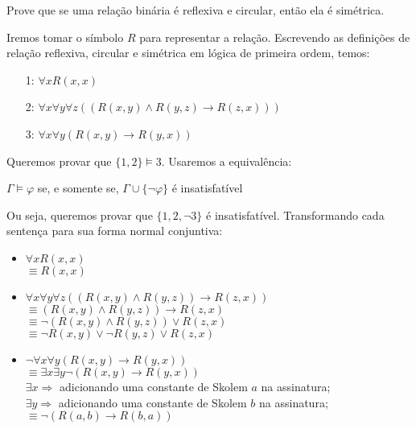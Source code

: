 \begin{rexercises}
    \begin{question}
        Prove que se uma relação binária é reflexiva e circular, então ela é simétrica.
        \begin{resolution}
            Iremos tomar o símbolo $R$ para representar a relação. Escrevendo as definições de relação reflexiva, circular e simétrica em lógica de primeira ordem, temos:
            \begin{enumerate}
                \item[1:] $\forall x R(x,x)$
                \item[2:] $\forall x\forall y\forall z((R(x, y) \land R(y, z) \rightarrow R(z, x)))$
                \item[3:] $\forall x\forall y(R(x,y) \rightarrow R(y, x))$
            \end{enumerate} 
            Queremos provar que $\{1, 2\} \vDash 3$. Usaremos a equivalência:
            \begin{center}
                $\Gamma \vDash \varphi$ se, e somente se, $\Gamma \cup \{\neg \varphi\}$ é insatisfatível
            \end{center}
            Ou seja, queremos provar que $\{1, 2, \neg 3\}$ é insatisfatível. Transformando cada sentença para sua forma normal conjuntiva:
            \begin{itemize}
                \item $\forall x R(x,x)$
                \\ $\equiv R(x, x)$ 
                \item $\forall x\forall y\forall z((R(x, y) \land R(y, z)) \rightarrow R(z, x))$
                \\ $\equiv (R(x, y) \land R(y, z)) \rightarrow R(z, x)$
                \\ $\equiv \neg (R(x, y) \land R(y, z)) \lor R(z, x)$
                \\ $\equiv \neg R(x, y) \lor \neg R(y, z) \lor R(z, x)$  
                \item $\neg \forall x\forall y(R(x,y) \rightarrow R(y, x))$
                \\ $\equiv \exists x \exists y \neg(R(x, y) \rightarrow R(y, x))$ 
                \\ $\exists x \Rightarrow$ adicionando uma constante de Skolem $a$ na assinatura;
                \\ $\exists y \Rightarrow$ adicionando uma constante de Skolem $b$ na assinatura;
                \\ $\equiv \neg(R(a, b) \rightarrow R(b, a))$ 

\end{itemize}
\end{resolution}
\end{question}
\end{rexercises}

